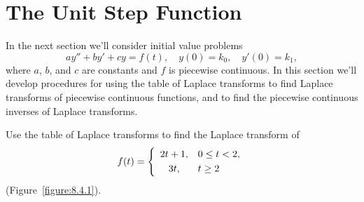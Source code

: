 \section{The Unit Step Function}

\noindent
In the next section we'll consider initial value problems
\[
  ay''+by'+cy=f(t),\quad y(0)=k_{0},\quad y'(0)=k_{1},
\]
where $a$, $b$, and $c$ are constants and $f$ is piecewise continuous. In this section we'll develop
procedures for using the table of Laplace transforms to find Laplace transforms of piecewise
continuous functions, and to find the piecewise continuous inverses of Laplace transforms.

\begin{example}
  \label{example:8.4.1}\rm Use the table of Laplace transforms to find the Laplace transform of
  \begin{equation}
    \label{eq:8.4.1}f(t)=\left\{
    \begin{array}{cl}
      2t+1, & 0\le t<2, \\[1\jot]
      3t,   & t\ge2
    \end{array}\right.
  \end{equation}
  (Figure~\ref{figure:8.4.1}).
\end{example}


